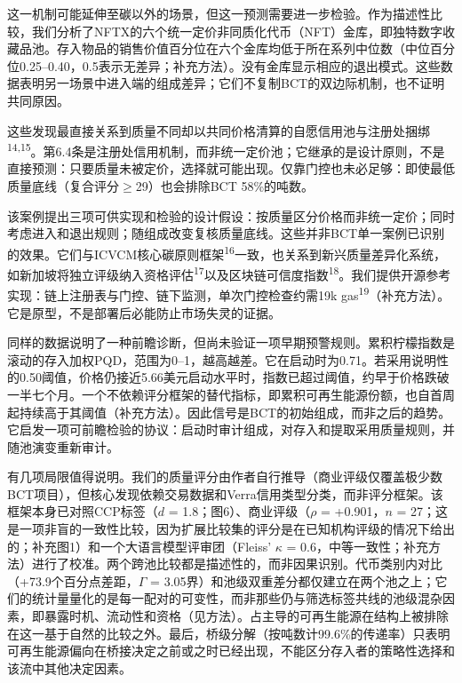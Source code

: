 \documentclass[12pt,a4paper]{article}
\begin{document}
这一机制可能延伸至碳以外的场景，但这一预测需要进一步检验。作为描述性比较，我们分析了NFTX的六个统一定价非同质化代币（NFT）金库，即独特数字收藏品池。存入物品的销售价值百分位在六个金库均低于所在系列中位数（中位百分位0.25--0.40，0.5表示无差异；补充方法）。没有金库显示相应的退出模式。这些数据表明另一场景中进入端的组成差异；它们不复制BCT的双边际机制，也不证明共同原因。

这些发现最直接关系到质量不同却以共同价格清算的自愿信用池与注册处捆绑\textsuperscript{14,15}。第6.4条是注册处信用机制，而非统一定价池；它继承的是设计原则，不是直接预测：只要质量未被定价，选择就可能出现。仅靠门控也未必足够：即使最低质量底线（复合评分$\geq$29）也会排除BCT 58\%的吨数。

该案例提出三项可供实现和检验的设计假设：按质量区分价格而非统一定价；同时考虑进入和退出规则；随组成改变复核质量底线。这些并非BCT单一案例已识别的效果。它们与ICVCM核心碳原则框架\textsuperscript{16}一致，也关系到新兴质量差异化系统，如新加坡将独立评级纳入资格评估\textsuperscript{17}以及区块链可信度指数\textsuperscript{18}。我们提供开源参考实现：链上注册表与门控、链下监测，单次门控检查约需19k gas\textsuperscript{19}（补充方法）。它是原型，不是部署后必能防止市场失灵的证据。

同样的数据说明了一种前瞻诊断，但尚未验证一项早期预警规则。累积柠檬指数是滚动的存入加权PQD，范围为0--1，越高越差。它在启动时为0.71。若采用说明性的0.50阈值，价格仍接近5.66美元启动水平时，指数已超过阈值，约早于价格跌破一半七个月。一个不依赖评分框架的替代指标，即累积可再生能源份额，也自首周起持续高于其阈值（补充方法）。因此信号是BCT的初始组成，而非之后的趋势。它启发一项可前瞻检验的协议：启动时审计组成，对存入和提取采用质量规则，并随池演变重新审计。

有几项局限值得说明。我们的质量评分由作者自行推导（商业评级仅覆盖极少数BCT项目），但核心发现依赖交易数据和Verra信用类型分类，而非评分框架。该框架本身已对照CCP标签（$d$ = 1.8；图6）、商业评级（$\rho$ = +0.901，$n$ = 27；这是一项非盲的一致性比较，因为扩展比较集的评分是在已知机构评级的情况下给出的；补充图1）和一个大语言模型评审团（Fleiss' $\kappa$ = 0.6，中等一致性；补充方法）进行了校准。两个跨池比较都是描述性的，而非因果识别。代币类别内对比（+73.9个百分点差距，$\Gamma$ = 3.05界）和池级双重差分都仅建立在两个池之上；它们的统计量量化的是每一配对的可变性，而非那些仍与筛选标签共线的池级混杂因素，即暴露时机、流动性和资格（见方法）。占主导的可再生能源在结构上被排除在这一基于自然的比较之外。最后，桥级分解（按吨数计99.6\%的传递率）只表明可再生能源偏向在桥接决定之前或之时已经出现，不能区分存入者的策略性选择和该流中其他决定因素。
\end{document}
